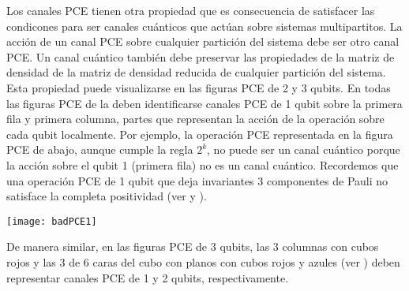 Los canales PCE tienen otra propiedad que es consecuencia de satisfacer 
las condicones para ser canales cuánticos que actúan sobre sistemas 
multipartitos. La acción de un canal PCE sobre cualquier partición del sistema debe 
ser otro canal PCE. Un canal cuántico también debe preservar las propiedades
de la matriz de densidad de la matriz de densidad reducida de cualquier
partición del sistema. Esta propiedad puede visualizarse en las figuras PCE
de 2 y 3 qubits. En todas las figuras PCE
de la  deben identificarse canales PCE de 1 qubit 
sobre la primera fila y primera columna, partes que representan la acción de
la operación sobre cada qubit localmente. Por ejemplo, la operación PCE 
representada en la figura PCE de abajo, aunque 
cumple la regla $2^k$, no puede ser un canal cuántico porque la acción 
sobre el qubit 1 (primera fila) no es un canal cuántico. Recordemos que 
una operación PCE de 1 qubit que deja invariantes 3 componentes de Pauli
no satisface la completa positividad (ver  y ).
\begin{center}
	\texttt{[image: badPCE1]}
\end{center}
De manera similar, en las figuras PCE de 3 qubits, las 3 columnas con cubos rojos y
las 3 de 6 caras del cubo con planos con cubos rojos y azules (ver )
deben representar
canales PCE de 1 y 2 qubits, respectivamente. 


